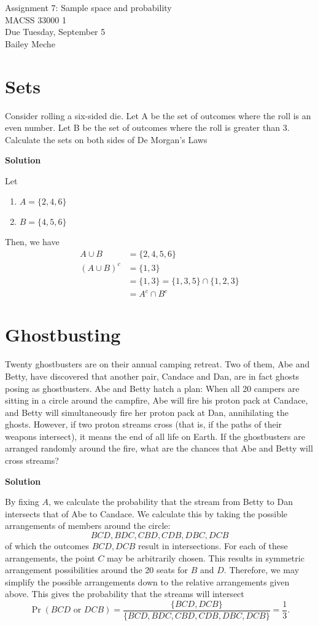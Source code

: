 \documentclass[12pt]{article}
\begin{document}
	\begin{center}
		Assignment 7: Sample space and probability\\
        MACSS 33000 1 \\
		Due Tuesday, September 5 \\
       Bailey Meche
	\end{center}

\section{Sets}
Consider rolling a six-sided die. Let A be the set of outcomes where the roll is an even number. Let B be the
set of outcomes where the roll is greater than 3. Calculate the sets on both sides of De Morgan’s Laws


\textbf{Solution}

Let 
\begin{enumerate}
    \item $A = \{2,4,6\}$
    \item $B = \{4,5,6\}$
\end{enumerate}
Then, we have 
\begin{align*}
    A \cup B &= \{2,4,5,6\} \\
    (A \cup B)^c &= \{1,3\}
    \\ &= \{1,3\} = \{1,3,5\} \cap \{1,2,3\}
    \\ &= A^c \cap B^c
\end{align*}

\section{Ghostbusting}
Twenty ghostbusters are on their annual camping retreat. Two of them, Abe and Betty, have discovered
that another pair, Candace and Dan, are in fact ghosts posing as ghostbusters. Abe and Betty hatch a plan:
When all 20 campers are sitting in a circle around the campfire, Abe will fire his proton pack at Candace,
and Betty will simultaneously fire her proton pack at Dan, annihilating the ghosts. However, if two proton
streams cross (that is, if the paths of their weapons intersect), it means the end of all life on Earth.
If the ghostbusters are arranged randomly around the fire, what are the chances that Abe and Betty will
cross streams?

\textbf{Solution}

By fixing $A$, we calculate the probability that the stream from Betty to Dan intersects that of Abe to Candace. We calculate this by taking the possible arrangements of members around the circle:
\[BCD,BDC,CBD,CDB,DBC,DCB\]
of which the outcomes $BCD,DCB$ result in intersections. For each of these arrangements, the point $C$ may be arbitrarily chosen. This results in symmetric arrangement possibilities around the 20 seats for $B$ and $D$. Therefore, we may simplify the possible arrangements down to the relative arrangements given above. This gives the probability that the streams will intersect
\[ \Pr(BCD \text{ or } DCB) = \frac{\{BCD,DCB\}}{\{BCD,BDC,CBD,CDB,DBC,DCB\}} = \frac{1}{3}.\]
\end{document}
